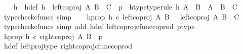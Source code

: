 \begin{isabellebody}
\ \ \isamarkupfalse%
\ h\ \ h{\isacharunderscore}{\kern0pt}def{\isacharcolon}{\kern0pt}\ {\isachardoublequoteopen}h\ {\isacharequal}{\kern0pt}\ {\isacharparenleft}{\kern0pt}left{\isacharunderscore}{\kern0pt}coproj\ A\ {\isacharparenleft}{\kern0pt}B\ {\isasymCoprod}\ C{\isacharparenright}{\kern0pt}{\isacharparenright}{\kern0pt}\ {\isasymamalg}\ p{\isachardoublequoteclose}\ \ h{\isacharunderscore}{\kern0pt}type{\isacharbrackleft}{\kern0pt}type{\isacharunderscore}{\kern0pt}rule{\isacharbrackright}{\kern0pt}{\isacharcolon}{\kern0pt}\ {\isachardoublequoteopen}h{\isacharcolon}{\kern0pt}\ {\isacharparenleft}{\kern0pt}A\ {\isasymCoprod}\ B{\isacharparenright}{\kern0pt}\ {\isasymrightarrow}\ A\ {\isasymCoprod}\ {\isacharparenleft}{\kern0pt}B\ {\isasymCoprod}\ C{\isacharparenright}{\kern0pt}{\isachardoublequoteclose}\isanewline
\ \ \ \ \isamarkupfalse%
\ {\isacharparenleft}{\kern0pt}typecheck{\isacharunderscore}{\kern0pt}cfuncs{\isacharcomma}{\kern0pt}\ simp{\isacharparenright}{\kern0pt}\isanewline
\ \ \isamarkupfalse%
\ h{\isacharunderscore}{\kern0pt}prop{}{\isacharcolon}{\kern0pt}\ {\isachardoublequoteopen}h\ {\isasymcirc}\isactrlsub c\ {\isacharparenleft}{\kern0pt}left{\isacharunderscore}{\kern0pt}coproj\ A\ B{\isacharparenright}{\kern0pt}\ \ {\isacharequal}{\kern0pt}\ {\isacharparenleft}{\kern0pt}left{\isacharunderscore}{\kern0pt}coproj\ A\ {\isacharparenleft}{\kern0pt}B\ {\isasymCoprod}\ C{\isacharparenright}{\kern0pt}{\isacharparenright}{\kern0pt}{\isachardoublequoteclose}\isanewline
\ \ \ \ \isamarkupfalse%
\ {\isacharparenleft}{\kern0pt}typecheck{\isacharunderscore}{\kern0pt}cfuncs{\isacharcomma}{\kern0pt}\ simp\ add{\isacharcolon}{\kern0pt}\ h{\isacharunderscore}{\kern0pt}def\ left{\isacharunderscore}{\kern0pt}coproj{\isacharunderscore}{\kern0pt}cfunc{\isacharunderscore}{\kern0pt}coprod\ p{\isacharunderscore}{\kern0pt}type{\isacharparenright}{\kern0pt}\isanewline
\ \ \isamarkupfalse%
\ h{\isacharunderscore}{\kern0pt}prop{}{\isacharcolon}{\kern0pt}\ {\isachardoublequoteopen}h\ {\isasymcirc}\isactrlsub c\ {\isacharparenleft}{\kern0pt}right{\isacharunderscore}{\kern0pt}coproj\ A\ B{\isacharparenright}{\kern0pt}\ {\isacharequal}{\kern0pt}\ p{\isachardoublequoteclose}\isanewline
\ \ \ \ \isamarkupfalse%
\ h{\isacharunderscore}{\kern0pt}def\ left{\isacharunderscore}{\kern0pt}proj{\isacharunderscore}{\kern0pt}type\ right{\isacharunderscore}{\kern0pt}coproj{\isacharunderscore}{\kern0pt}cfunc{\isacharunderscore}{\kern0pt}coprod\ \isamarkupfalse%

\end{isabellebody}
